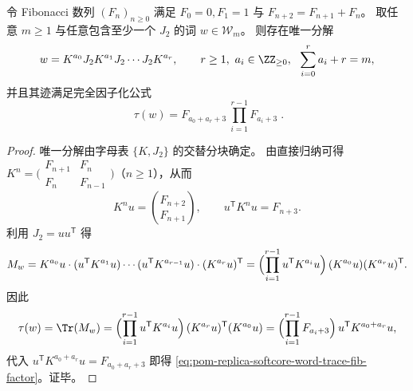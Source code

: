 \begin{proposition}\label{prop:pom-replica-softcore-word-trace-fibonacci-factorization}
令 Fibonacci 数列 \((F_n)_{n\ge 0}\) 满足 \(F_0=0,F_1=1\) 与 \(F_{n+2}=F_{n+1}+F_n\)。
取任意 \(m\ge 1\) 与任意包含至少一个 \(J_2\) 的词 \(w\in\mathcal{W}_m\)。
则存在唯一分解
\[
w=K^{a_0}J_2K^{a_1}J_2\cdots J_2K^{a_r},
\qquad
r\ge 1,\ a_i\in\ZZ_{\ge 0},\ \ \sum_{i=0}^{r}a_i+r=m,
\]
并且其迹满足完全因子化公式
\begin{equation}\label{eq:pom-replica-softcore-word-trace-fib-factor}
\boxed{\;
\tau(w)=F_{a_0+a_r+3}\ \prod_{i=1}^{r-1}F_{a_i+3}\; }.
\end{equation}
\end{proposition}
\begin{proof}
唯一分解由字母表 \(\{K,J_2\}\) 的交替分块确定。
由直接归纳可得
\(
K^n=\bigl(\begin{smallmatrix}F_{n+1}&F_n\\[2pt]F_n&F_{n-1}\end{smallmatrix}\bigr)
\)（\(n\ge 1\)），从而
\[
K^n u=\binom{F_{n+2}}{F_{n+1}},
\qquad
u^{\mathsf T}K^n u=F_{n+3}.
\]
利用 \(J_2=uu^{\mathsf T}\) 得
\[
M_w
=K^{a_0}u\cdot (u^{\mathsf T}K^{a_1}u)\cdots (u^{\mathsf T}K^{a_{r-1}}u)\cdot (K^{a_r}u)^{\mathsf T}
=\Bigl(\prod_{i=1}^{r-1}u^{\mathsf T}K^{a_i}u\Bigr)\,(K^{a_0}u)(K^{a_r}u)^{\mathsf T}.
\]
因此
\[
\tau(w)=\Tr(M_w)
=\Bigl(\prod_{i=1}^{r-1}u^{\mathsf T}K^{a_i}u\Bigr)\,(K^{a_r}u)^{\mathsf T}(K^{a_0}u)
=\Bigl(\prod_{i=1}^{r-1}F_{a_i+3}\Bigr)\,u^{\mathsf T}K^{a_0+a_r}u,
\]
代入 \(u^{\mathsf T}K^{a_0+a_r}u=F_{a_0+a_r+3}\) 即得 \eqref{eq:pom-replica-softcore-word-trace-fib-factor}。证毕。
\end{proof}


